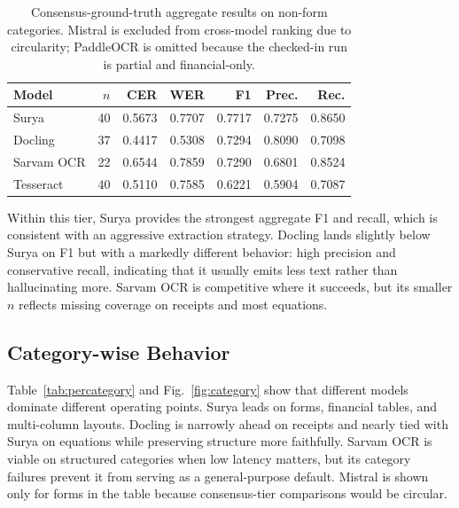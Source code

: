 \documentclass[conference]{IEEEtran}
\begin{document}
\begin{table}[t]
\centering
\caption{Consensus-ground-truth aggregate results on non-form categories. Mistral is excluded from cross-model ranking due to circularity; PaddleOCR is omitted because the checked-in run is partial and financial-only.}
\label{tab:consensus}
\footnotesize
\begin{tabular}{lrrrrrr}
\toprule
\textbf{Model} & \textbf{$n$} & \textbf{CER} & \textbf{WER} & \textbf{F1} & \textbf{Prec.} & \textbf{Rec.} \\
\midrule
Surya & 40 & 0.5673 & 0.7707 & 0.7717 & 0.7275 & 0.8650 \\
Docling & 37 & 0.4417 & 0.5308 & 0.7294 & 0.8090 & 0.7098 \\
Sarvam OCR & 22 & 0.6544 & 0.7859 & 0.7290 & 0.6801 & 0.8524 \\
Tesseract & 40 & 0.5110 & 0.7585 & 0.6221 & 0.5904 & 0.7087 \\
\bottomrule
\end{tabular}
\end{table}

Within this tier, Surya provides the strongest aggregate F1 and recall, which is consistent with an aggressive extraction strategy. Docling lands slightly below Surya on F1 but with a markedly different behavior: high precision and conservative recall, indicating that it usually emits less text rather than hallucinating more. Sarvam OCR is competitive where it succeeds, but its smaller $n$ reflects missing coverage on receipts and most equations.

\subsection{Category-wise Behavior}

Table~\ref{tab:percategory} and Fig.~\ref{fig:category} show that different models dominate different operating points. Surya leads on forms, financial tables, and multi-column layouts. Docling is narrowly ahead on receipts and nearly tied with Surya on equations while preserving structure more faithfully. Sarvam OCR is viable on structured categories when low latency matters, but its category failures prevent it from serving as a general-purpose default. Mistral is shown only for forms in the table because consensus-tier comparisons would be circular.
\end{document}

